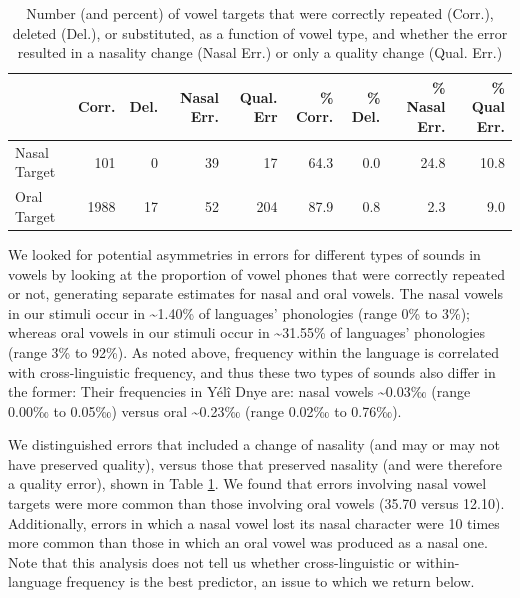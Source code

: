 \documentclass[
  american,
  ,man,floatsintext]{apa6}
\begin{document}
\begin{table}

\caption{\label{tab:tab-v}Number (and percent) of vowel targets that were correctly repeated (Corr.), deleted (Del.), or substituted, as a function of vowel type, and whether the error resulted in a nasality change (Nasal Err.) or only a quality change (Qual. Err.)}
\centering
\begin{tabular}[t]{lrrrrrrrr}
\toprule
  & Corr. & Del. & Nasal Err. & Qual. Err & \% Corr. & \% Del. & \% Nasal Err. & \% Qual Err.\\
\midrule
Nasal Target & 101 & 0 & 39 & 17 & 64.3 & 0.0 & 24.8 & 10.8\\
Oral Target & 1988 & 17 & 52 & 204 & 87.9 & 0.8 & 2.3 & 9.0\\
\bottomrule
\end{tabular}
\end{table}

We looked for potential asymmetries in errors for different types of sounds in vowels by looking at the proportion of vowel phones that were correctly repeated or not, generating separate estimates for nasal and oral vowels. The nasal vowels in our stimuli occur in \textasciitilde1.40\% of languages' phonologies (range 0\% to 3\%);
whereas oral vowels in our stimuli occur in \textasciitilde31.55\% of languages' phonologies (range 3\% to 92\%).
As noted above, frequency within the language is correlated with cross-linguistic frequency, and thus these two types of sounds also differ in the former: Their frequencies in Yélî Dnye are: nasal vowels \textasciitilde0.03‰ (range 0.00‰ to 0.05‰) versus oral \textasciitilde0.23‰ (range 0.02‰ to 0.76‰).

We distinguished errors that included a change of nasality (and may or may not have preserved quality), versus those that preserved nasality (and were therefore a quality error), shown in Table \ref{tab:tab-v}. We found that errors involving nasal vowel targets were more common than those involving oral vowels (35.70 versus 12.10). Additionally, errors in which a nasal vowel lost its nasal character were 10 times more common than those in which an oral vowel was produced as a nasal one. Note that this analysis does not tell us whether cross-linguistic or within-language frequency is the best predictor, an issue to which we return below.
\end{document}
